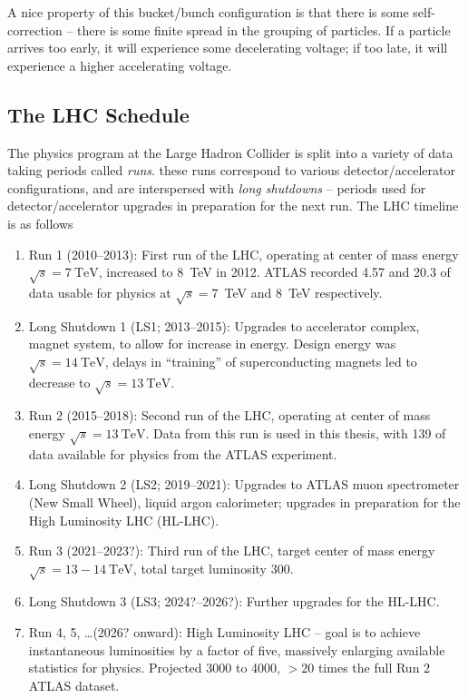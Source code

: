 A nice property of this bucket/bunch configuration is that there is some self-correction -- there is 
some finite spread in the grouping of particles. If a particle arrives too early, it will experience some 
decelerating voltage; if too late, it will experience a higher accelerating voltage.

\subsection{The LHC Schedule}
The physics program at the Large Hadron Collider is split into a variety of data taking periods called \emph{runs}.
these runs correspond to various detector/accelerator configurations, and are interspersed with \emph{long shutdowns} -- 
periods used for detector/accelerator upgrades in preparation for the next run. The LHC timeline is as follows 
\begin{enumerate}
	\item Run 1 (2010--2013): First run of the LHC, operating at center of mass energy $\sqrt{s}=\SI{7}{\TeV}$, 
	increased to \SI{8}{\TeV} in 2012. ATLAS recorded \SI{4.57}{\ifb} and \SI{20.3}{\ifb} of data usable for physics
	at $\sqrt{s}=$\SI{7}{\TeV} and \SI{8}{\TeV} respectively.
	\item Long Shutdown 1 (LS1; 2013--2015): Upgrades to accelerator complex, magnet system, to allow for increase 
	in energy. Design energy was $\sqrt{s}=\SI{14}{\TeV}$, delays in ``training'' of superconducting magnets 
	led to decrease to $\sqrt{s}=\SI{13}{\TeV}$.
	\item Run 2 (2015--2018): Second run of the LHC, operating at center of mass energy $\sqrt{s}=\SI{13}{\TeV}$. 
	Data from this run is used in this thesis, with \SI{139}{\ifb} of data available for physics from the ATLAS
	experiment.
	\item Long Shutdown 2 (LS2; 2019--2021): Upgrades to ATLAS muon spectrometer (New Small Wheel), liquid argon 
	calorimeter; upgrades in preparation for the High Luminosity LHC (HL-LHC).
	\item Run 3 (2021--2023?): Third run of the LHC, target center of mass energy $\sqrt{s}=13-\SI{14}{\TeV}$, 
	total target luminosity \SI{300}{\ifb}.
	\item Long Shutdown 3 (LS3; 2024?--2026?): Further upgrades for the HL-LHC.
	\item Run 4, 5, \ldots (2026? onward): High Luminosity LHC -- goal is to achieve instantaneous luminosities 
	by a factor of five, massively enlarging available statistics for physics. Projected 3000 to \SI{4000}{\ifb}, 
	$> 20$ times the full Run 2 ATLAS dataset.
\end{enumerate}


